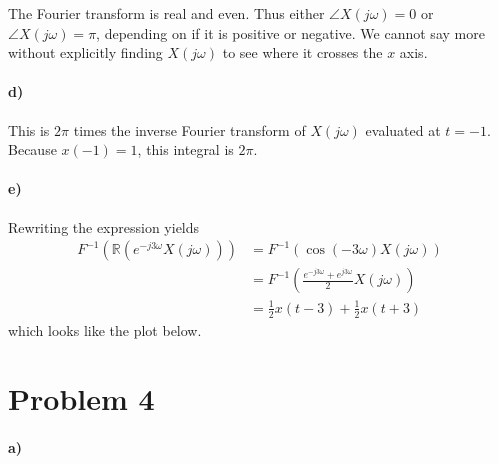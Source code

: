 \documentclass[12pt]{article}
\begin{document}
The Fourier transform is real and even. Thus either \(\angle X(j\omega)=0\) or \(\angle X(j\omega)=\pi\), depending on if it is positive or negative. We cannot
say more without explicitly finding \(X(j\omega)\) to see where it crosses the \(x\) axis.

\paragraph{d)}

This is \(2\pi\) times the inverse Fourier transform of \(X(j\omega)\) evaluated at \(t=-1\). Because \(x(-1)=1\), this integral is \(2\pi\).

\paragraph{e)}

Rewriting the expression yields
\begin{align*}
    F^{-1}(\mathbb{R}(e^{-j3\omega}X(j\omega)))&=F^{-1}(\cos(-3\omega)X(j\omega))\\
    &=F^{-1}\left(\frac{e^{-j3\omega} + e^{j3\omega}}{2}X(j\omega)\right)\\
    &=\frac{1}{2}x(t-3)+\frac{1}{2}x(t+3)
\end{align*}
which looks like the plot below.
\begin{center}
\end{center}

\section*{Problem 4}

\paragraph{a)}
\end{document}
